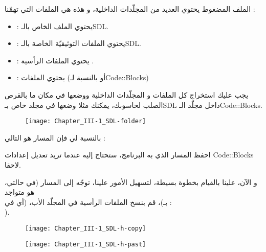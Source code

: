 الملف المضغوط يحتوي العديد من المجلّدات الداخلية، و هذه هي الملفات التي تهمّنا :

\begin{itemize}
	\item {} :
	يحتوي الملف 
	الخاص بالـ\textenglish{SDL}.
	\item {} :
	يحتوي الملفات التوثيقيّة الخاصة بالـ\textenglish{SDL}.
	\item {} :
	يحتوي الملفات الرأسية
	.
	\item {} :
	يحتوي الملفات 
	(أو
	بالنسبة لـ\textenglish{Code::Blocks})
\end{itemize}

يجب عليك استخراج كل الملفات و المجلّدات الداخلية ووضعها في مكان ما بالقرص الصلب لحاسوبك، يمكنك مثلا وضعها في مجلد خاص بـ\textenglish{SDL}
داخل مجلّد الـ\textenglish{Code::Blocks}.

\begin{figure}[H]
	\centering
	\texttt{[image: Chapter\_III-1\_SDL-folder]}
\end{figure}


بالنسبة لي فإن المسار هو التالي :


احفظ المسار الذي به البرنامج، ستحتاج إليه عندما تريد تعديل إعدادات 
\textenglish{Code::Blocks}
لاحقا.

و الآن، علينا بالقيام بخطوة بسيطة، لتسهيل الأمور علينا، توجّه إلى المسار
(في حالتي، هو متواجد\\
بـ)،
قم بنسخ الملفات الرأسية
 في المجلّد الأب، (أي في :\\ 
).

\begin{figure}[H]
	\centering
	\texttt{[image: Chapter\_III-1\_SDL-h-copy]}
\end{figure}
\begin{figure}[H]
	\centering
	\texttt{[image: Chapter\_III-1\_SDL-h-past]}
\end{figure}

